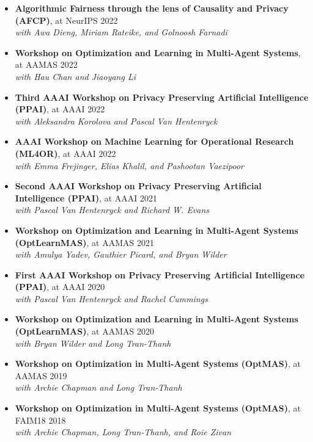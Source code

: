 \begin{itemize}
    \item
    {\bf Algorithmic Fairness through the lens of Causality and Privacy (AFCP)}, at NeurIPS \hfill {2022}
    \\{\em with Awa Dieng, Miriam Rateike, and Golnoosh Farnadi}

    \item 
    {\bf Workshop on Optimization and Learning in Multi-Agent Systems}, at AAMAS \hfill{2022}
    \\{\em with Hau Chan and Jiaoyang Li}

    \item 
    {\bf Third AAAI Workshop on Privacy Preserving Artificial Intelligence (PPAI)}, at AAAI   \hfill{2022}
    \\{\em with Aleksandra Korolova and Pascal Van Hentenryck}
    \item 
    {\bf AAAI Workshop on Machine Learning for Operational Research (ML4OR)}, at AAAI   \hfill{2022}
    \\{\em with Emma Frejinger, Elias Khalil, and Pashootan Vaezipoor}
    \item 
    {\bf Second AAAI Workshop on Privacy Preserving Artificial Intelligence (PPAI)}, at AAAI   \hfill{2021}
    \\{\em with Pascal Van Hentenryck and Richard W. Evans}
    \item 
    {\bf Workshop on Optimization and Learning in Multi-Agent Systems (OptLearnMAS)}, at AAMAS \hfill{2021}
    \\{\em with Amulya Yadev, Gauthier Picard, and Bryan Wilder}
    \item 
    {\bf First AAAI Workshop on Privacy Preserving Artificial Intelligence (PPAI)}, at AAAI   \hfill{2020}
    \\{\em with Pascal Van Hentenryck and Rachel Cummings}
    \item 
    {\bf Workshop on Optimization and Learning in Multi-Agent Systems (OptLearnMAS)}, at AAMAS \hfill{2020}
    \\{\em with Bryan Wilder and Long Tran-Thanh}
    \item 
    {\bf Workshop on Optimization in Multi-Agent Systems (OptMAS)}, at AAMAS \hfill{2019}
    \\{\em with Archie Chapman and Long Tran-Thanh}
    \item 
    {\bf Workshop on Optimization in Multi-Agent Systems (OptMAS)}, at FAIM18 \hfill{2018}
    \\{\em with Archie Chapman, Long Tran-Thanh, and Roie Zivan}
  \end{itemize}
  
